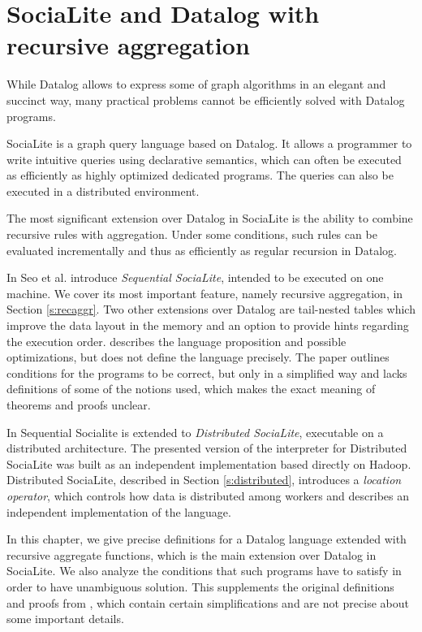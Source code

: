 
\chapter{SociaLite and Datalog with recursive aggregation}\label{r:socialite}

While Datalog allows to express some of graph algorithms
in an elegant and succinct way, many practical problems cannot be efficiently solved with Datalog programs.

SociaLite \cite{socialite, distsoc} is a graph query language based on Datalog.  It allows a programmer to write intuitive queries using declarative semantics, which can often be executed as efficiently as highly optimized dedicated programs. The queries can also be executed in a distributed environment.

The most significant extension over Datalog in SociaLite is the ability to combine recursive rules with aggregation. Under some conditions, such rules can be evaluated incrementally and thus as efficiently as regular recursion in Datalog.

In \cite{socialite} Seo et al. introduce \emph{Sequential SociaLite}, intended to be executed on one machine. We cover its most important feature, namely recursive aggregation, in Section \ref{s:recaggr}. Two other extensions over Datalog are tail-nested tables which improve the data layout in the memory and an option to provide hints regarding the execution order. \cite{socialite} describes the language proposition and possible optimizations, but does not define the language precisely. The paper outlines conditions for the programs to be correct, but only in a simplified way and lacks definitions of some of the notions used, which makes the exact meaning of theorems and proofs unclear.

In \cite{distsoc} Sequential Socialite is extended to \emph{Distributed SociaLite}, executable on a distributed architecture. The presented version of the interpreter for Distributed SociaLite was built as an independent implementation based directly on Hadoop. Distributed SociaLite, described in Section \ref{s:distributed}, introduces a \emph{location operator}, which controls how data is distributed among workers and describes an independent implementation of the language. 

In this chapter, we give precise definitions for a Datalog language extended with recursive aggregate functions, which is the main extension over Datalog in SociaLite. We also analyze the conditions that such programs have to satisfy in order to have unambiguous solution. This supplements the original definitions and proofs from \cite{socialite, distsoc}, which contain certain simplifications and are not precise about some important details.

